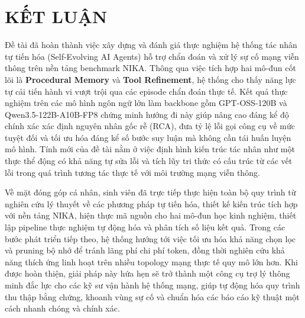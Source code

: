 \section{KẾT LUẬN}

Đề tài đã hoàn thành việc xây dựng và đánh giá thực nghiệm hệ thống tác nhân tự tiến hóa (Self-Evolving AI Agents) hỗ trợ chẩn đoán và xử lý sự cố mạng viễn thông trên nền tảng benchmark NIKA. Thông qua việc tích hợp hai mô-đun cốt lõi là \textbf{Procedural Memory} và \textbf{Tool Refinement}, hệ thống cho thấy năng lực tự cải tiến hành vi vượt trội qua các episode chẩn đoán thực tế. Kết quả thực nghiệm trên các mô hình ngôn ngữ lớn làm backbone gồm GPT-OSS-120B và Qwen3.5-122B-A10B-FP8 chứng minh hướng đi này giúp nâng cao đáng kể độ chính xác xác định nguyên nhân gốc rễ (RCA), đưa tỷ lệ lỗi gọi công cụ về mức tuyệt đối và tối ưu hóa đáng kể số bước suy luận mà không cần tái huấn luyện mô hình. Tính mới của đề tài nằm ở việc định hình kiến trúc tác nhân như một thực thể động có khả năng tự sửa lỗi và tích lũy tri thức có cấu trúc từ các vết lỗi trong quá trình tương tác thực tế với môi trường mạng viễn thông.

Về mặt đóng góp cá nhân, sinh viên đã trực tiếp thực hiện toàn bộ quy trình từ nghiên cứu lý thuyết về các phương pháp tự tiến hóa, thiết kế kiến trúc tích hợp với nền tảng NIKA, hiện thực mã nguồn cho hai mô-đun học kinh nghiệm, thiết lập pipeline thực nghiệm tự động hóa và phân tích số liệu kết quả. Trong các bước phát triển tiếp theo, hệ thống hướng tới việc tối ưu hóa khả năng chọn lọc và pruning bộ nhớ để tránh lãng phí chi phí token, đồng thời nghiên cứu khả năng thích ứng linh hoạt trên nhiều topology mạng thực tế quy mô lớn hơn. Khi được hoàn thiện, giải pháp này hứa hẹn sẽ trở thành một công cụ trợ lý thông minh đắc lực cho các kỹ sư vận hành hệ thống mạng, giúp tự động hóa quy trình thu thập bằng chứng, khoanh vùng sự cố và chuẩn hóa các báo cáo kỹ thuật một cách nhanh chóng và chính xác.
